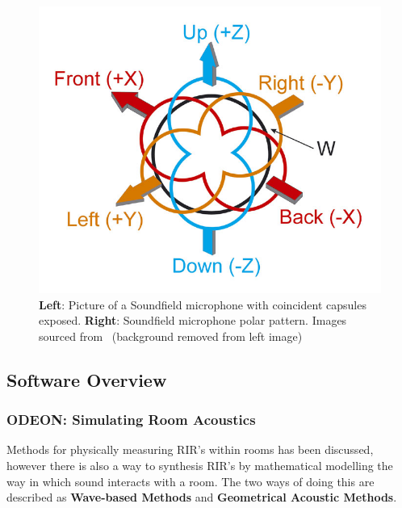 \documentclass[../../main.tex]{subfiles}
\begin{document}
\begin{figure}[ht]
\begin{minipage}{0.5\textwidth}
				\center\includegraphics[scale = 0.3]{Sections/Background/images/soundFieldPolar.jpg}
			\end{minipage}
			\caption{\textbf{Left}: Picture of a Soundfield microphone with coincident capsules exposed. \textbf{Right}: Soundfield microphone polar pattern. Images sourced from~\cite{soundfieldMic} (background removed from left image) }
			\label{sfMic}
		\end{figure}

	\subsection{Software Overview}

		\subsubsection{ODEON: Simulating Room Acoustics}
		\label{Software:Odeon}

			Methods for physically measuring \ac{RIR}'s within rooms has been discussed, however there is also a way to synthesis \ac{RIR}'s by mathematical modelling the way in which sound interacts with a room. The two ways of doing this are described as \textbf{Wave-based Methods} and \textbf{Geometrical Acoustic Methods}.
\end{document}

